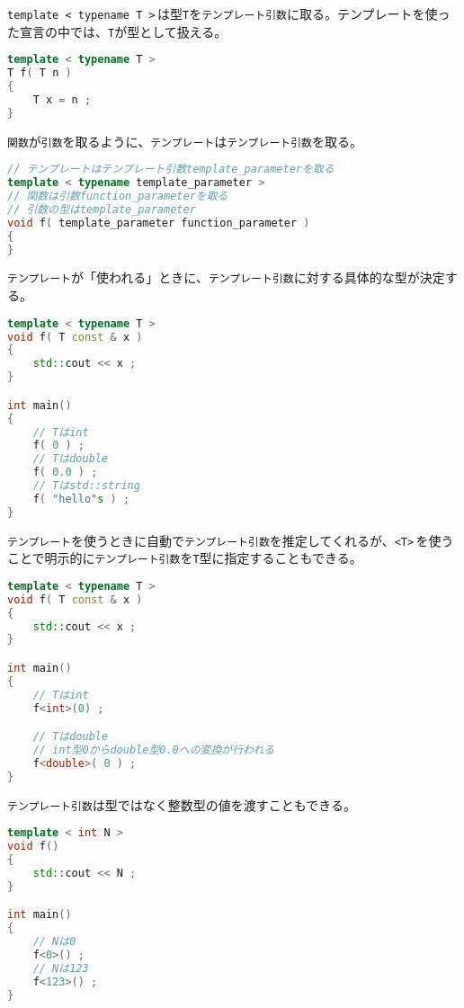 \texttt{template < typename T >}\,は型\texttt{T}を\texttt{テンプレート引数}に取る。テンプレートを使った宣言の中では、\texttt{T}が型として扱える。

\begin{lstlisting}[language={C++}]
template < typename T >
T f( T n )
{
    T x = n ;
}
\end{lstlisting}

\texttt{関数}が\texttt{引数}を取るように、\texttt{テンプレート}は\texttt{テンプレート引数}を取る。

\ifTombow\pagebreak\fi
\begin{lstlisting}[language={C++}]
// テンプレートはテンプレート引数template_parameterを取る
template < typename template_parameter >
// 関数は引数function_parameterを取る
// 引数の型はtemplate_parameter
void f( template_parameter function_parameter )
{
}
\end{lstlisting}

\texttt{テンプレート}が「使われる」ときに、\texttt{テンプレート引数}に対する具体的な型が決定する。

\begin{lstlisting}[language={C++}]
template < typename T >
void f( T const & x )
{
    std::cout << x ;
}

int main()
{
    // Tはint
    f( 0 ) ;
    // Tはdouble
    f( 0.0 ) ;
    // Tはstd::string
    f( "hello"s ) ;
}
\end{lstlisting}

\texttt{テンプレート}を使うときに自動で\texttt{テンプレート引数}を推定してくれるが、\texttt{<T>}\,を使うことで明示的に\texttt{テンプレート引数}を\texttt{T}型に指定することもできる。

\begin{lstlisting}[language={C++}]
template < typename T >
void f( T const & x )
{
    std::cout << x ;
}

int main()
{
    // Tはint
    f<int>(0) ;

    // Tはdouble
    // int型0からdouble型0.0への変換が行われる
    f<double>( 0 ) ;
}
\end{lstlisting}

\texttt{テンプレート引数}は型ではなく整数型の値を渡すこともできる。

\begin{lstlisting}[language={C++}]
template < int N >
void f()
{
    std::cout << N ;
}

int main()
{
    // Nは0
    f<0>() ;
    // Nは123
    f<123>() ;
}
\end{lstlisting}

